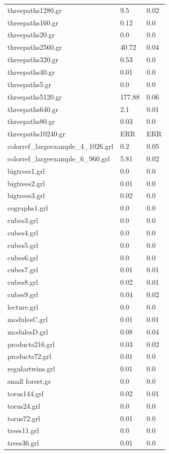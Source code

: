 \documentclass[11pt]{article}
\begin{document}
\begin{table}[h!]
\begin{tabularx}{\textwidth}{|l|X|X|}
		threepaths1280.gr & 9.5 & 0.02 \\
		threepaths160.gr & 0.12 & 0.0 \\
		threepaths20.gr & 0.0 & 0.0 \\
		threepaths2560.gr & 40.72 & 0.04 \\
		threepaths320.gr & 0.53 & 0.0 \\
		threepaths40.gr & 0.01 & 0.0 \\
		threepaths5.gr & 0.0 & 0.0 \\
		threepaths5120.gr & 177.88 & 0.06 \\
		threepaths640.gr & 2.1 & 0.01 \\
		threepaths80.gr & 0.03 & 0.0 \\
		threepaths10240.gr & ERR & ERR \\
		colorref\_largeexample\_4\_1026.grl & 0.2 & 0.05 \\
		colorref\_largeexample\_6\_960.grl & 5.81 & 0.02 \\
		bigtrees1.grl & 0.0 & 0.0 \\
		bigtrees2.grl & 0.01 & 0.0 \\
		bigtrees3.grl & 0.02 & 0.0 \\
		cographs1.grl & 0.0 & 0.0 \\
		cubes3.grl & 0.0 & 0.0 \\
		cubes4.grl & 0.0 & 0.0 \\
		cubes5.grl & 0.0 & 0.0 \\
		cubes6.grl & 0.0 & 0.0 \\
		cubes7.grl & 0.01 & 0.01 \\
		cubes8.grl & 0.02 & 0.01 \\
		cubes9.grl & 0.04 & 0.02 \\
		lecture.grl & 0.0 & 0.0 \\
		modulesC.grl & 0.01 & 0.01 \\
		modulesD.grl & 0.08 & 0.04 \\
		products216.grl & 0.03 & 0.02 \\
		products72.grl & 0.01 & 0.0 \\
		regulartwins.grl & 0.01 & 0.0 \\
		small forest.gr & 0.0 & 0.0 \\
		torus144.grl & 0.02 & 0.01 \\
		torus24.grl & 0.0 & 0.0 \\
		torus72.grl & 0.01 & 0.0 \\
		trees11.grl & 0.0 & 0.0 \\
		trees36.grl & 0.01 & 0.0 \\

\end{tabularx}
\end{table}
\end{document}
